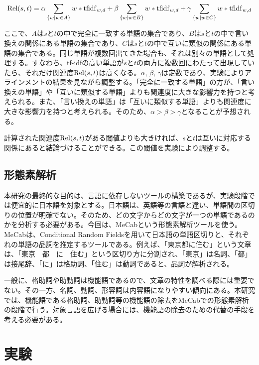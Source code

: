 \documentclass[12pt]{jarticle}
\begin{document}
\begin{equation}
  {\rm Rel}(s, t) = \alpha \sum_{\{w|w \in A\}} w * {\rm tfidf}_{w, d} +
                    \beta  \sum_{\{w|w \in B\}} w * {\rm tfidf}_{w, d} +
                    \gamma \sum_{\{w|w \in C\}} w * {\rm tfidf}_{w, d}
  \label{eq:rel}
\end{equation}

ここで、$A$は$s$と$t$の中で完全に一致する単語の集合であり、$B$は$s$と$t$の中で言い換えの関係にある単語の集合であり、$C$は$s$と$t$の中で互いに類似の関係にある単語の集合である。同じ単語が複数回出てきた場合も、それは別々の単語として処理する。すなわち、tf-idfの高い単語が$s$と$t$の両方に複数回にわたって出現していたら、それだけ関連度${\rm Rel}(s, t)$は高くなる。$\alpha$, $\beta$, $\gamma$は定数であり、実験によりアラインメントの結果を見ながら調整する。「完全に一致する単語」の方が、「言い換えの単語」や「互いに類似する単語」よりも関連度に大きな影響力を持つと考えられる。また、「言い換えの単語」は「互いに類似する単語」よりも関連度に大きな影響力を持つと考えられる。そのため、$\alpha > \beta > \gamma$となることが予想される。


計算された関連度${\rm Rel}(s, t)$がある閾値よりも大きければ、$s$と$t$は互いに対応する関係にあると結論づけることができる。この閾値を実験により調整する。

\subsection{形態素解析}
本研究の最終的な目的は、言語に依存しないツールの構築であるが、実験段階では便宜的に日本語を対象とする。日本語は、英語等の言語と違い、単語間の区切りの位置が明確でない。そのため、どの文字からどの文字が一つの単語であるのかを分析する必要がある。今回は、MeCab\cite{MeCab}という形態素解析ツールを使う。MeCabは、Conditional Random Fieldsを用いて日本語の単語区切りと、それぞれの単語の品詞を推定するツールである。例えば、「東京都に住む」という文章は、「東京　都　に　住む」という区切り方に分割され、「東京」は名詞、「都」は接尾辞、「に」は格助詞、「住む」は動詞であると、品詞が解析される。

一般に、格助詞や助動詞は機能語であるので、文章の特性を調べる際には重要でない。その一方、名詞、動詞、形容詞は内容語になりやすい傾向にある。本研究では、機能語である格助詞、助動詞等の機能語の除去をMeCabでの形態素解析の段階で行う。対象言語を広げる場合には、機能語の除去のための代替の手段を考える必要がある。

\section{実験}
\end{document}
